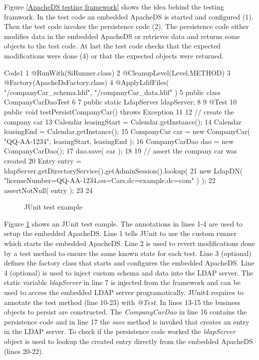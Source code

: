 \documentclass[a4paper,11pt,oneside]{article}
\begin{document}
Figure \ref{ApacheDS testing framework} shows the idea behind the testing framwork. In the test code an embedded ApacheDS is started and configured (1). Then the test code invokes the persistence code (2). The persistence code either modifies data in the embedded ApacheDS or retrieves data and returns some objects to the test code. At last the test code checks that the expected modifications were done (4) or that the expected objects were returned.

\begin{SaveVerbatim}{Code1}
 1    @RunWith(SiRunner.class)
 2    @CleanupLevel(Level.METHOD)
 3    @Factory(ApacheDsFactory.class)
 4    @ApplyLdifFiles( { "/companyCar_schema.ldif", "/companyCar_data.ldif" } )
 5    public class CompanyCarDaoTest
 6    {
 7        public static LdapServer ldapServer;
 8    
 9        @Test
10        public void testPersistCompanyCar() throws Exception
11        {
12            // create the company car
13            Calendar leasingStart = Calendar.getInstance();
14            Calendar leasingEnd = Calendar.getInstance();
15            CompanyCar car = new CompanyCar( "QQ-AA-1234", leasingStart, leasingEnd );
16            CompanyCarDao dao = new CompanyCarDao();
17            dao.save( car );
18    
19            // assert the company car was created
20            Entry entry = ldapServer.getDirectoryService().getAdminSession().lookup(
21                new LdapDN( "licenseNumber=QQ-AA-1234,ou=Cars,dc=example,dc=com" ) );
22            assertNotNull( entry );
23        }
24    }
\end{SaveVerbatim}
\begin{figure}[htb]
  \caption{JUnit test example}
  \label{JUnit test example}
\end{figure}

Figure \ref{JUnit test example} shows an JUnit test eample. The annotations in lines 1-4 are used to setup the embedded ApacheDS. Line 1 tells JUnit to use the custom runner which starts the embedded ApacheDS. Line 2 is used to revert modifications done by a test method to ensure the same known state for each test. Line 3 (optional) defines the factory class that starts and configures the embedded ApacheDS. Line 4 (optional) is used to inject custom schema and data into the LDAP server. The static variable \textit{ldapServer} in line 7 is injected from the framework and can be used to access the embedded LDAP server programatically. JUnit4 requires to annotate the test method (line 10-23) with \textit{@Test}. In lines 13-15 the business objects to persist are constructed. The \textit{CompanyCarDao} in line 16 contains the persistence code and in line 17 the \textit{save} method is invoked that creates an entry in the LDAP server. To check if the persistence code worked the \textit{ldapServer} object is used to lookup the created entry directly from the embedded ApacheDS (lines 20-22).
\end{document}
